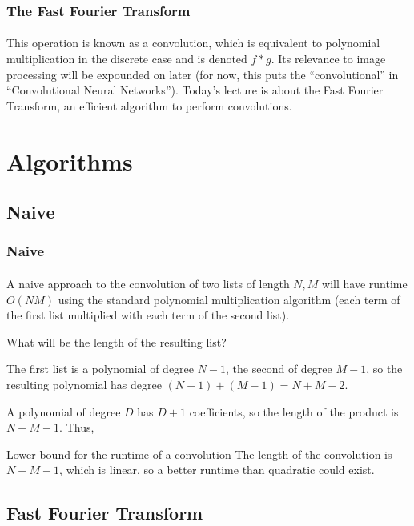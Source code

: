 \documentclass{beamer}                             %
\begin{document}
\begin{frame}
\frametitle{The Fast Fourier Transform}
\framesubtitle{}
This operation is known as a \alert{convolution}, which is equivalent to
polynomial multiplication in the discrete case and is denoted \( f * g \).
Its relevance to image processing will be expounded on later
(for now, this puts the \enquote{convolutional}
in \enquote{Convolutional Neural Networks}).
Today's lecture is about the \alert{Fast Fourier Transform}, an efficient
algorithm to perform convolutions.
\end{frame}

\section{Algorithms}
\subsection{Naive}
\begin{frame}
\frametitle{Naive}
\framesubtitle{}
A naive approach to the convolution of two lists of length \( N, M \) will have
runtime \( O(NM) \) using the standard polynomial multiplication algorithm (each
term of the first list multiplied with each term of the second list). \pause

What will be the length of the resulting list? \pause

The first list is a polynomial of degree \( N - 1 \),
the second of degree \( M - 1 \), so the resulting polynomial has degree 
\( (N - 1) + (M - 1) = N + M - 2 \). \pause 

A polynomial of degree \( D \) has \( D + 1 \) coefficients, 
so the length of the product is \( N + M - 1 \). Thus, \pause
\begin{block}{Lower bound for the runtime of a convolution}
  The length of the convolution is \( N + M - 1 \), which is linear,
  so a better runtime than quadratic could exist. 
\end{block}
\end{frame}

\subsection[FTT]{Fast Fourier Transform}
\end{document}
